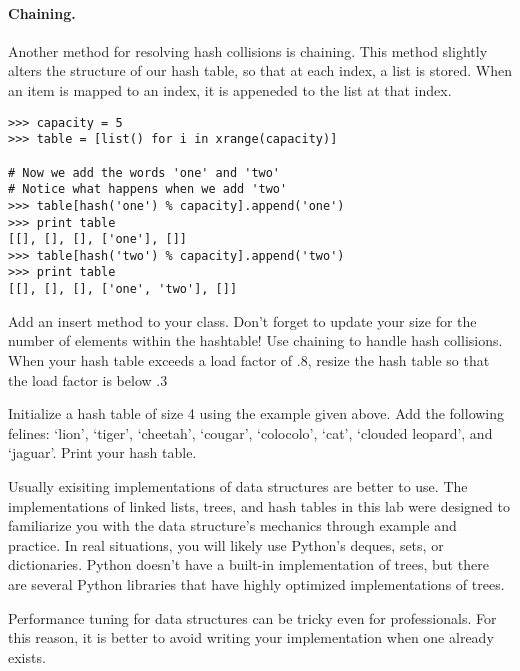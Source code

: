 \paragraph{Chaining.}
Another method for resolving hash collisions is chaining.
This method slightly alters the structure of our hash table, so that at each index, a list is stored.
When an item is mapped to an index, it is appeneded to the list at that index.
\begin{lstlisting}
>>> capacity = 5
>>> table = [list() for i in xrange(capacity)]

# Now we add the words 'one' and 'two'
# Notice what happens when we add 'two'
>>> table[hash('one') % capacity].append('one')
>>> print table
[[], [], [], ['one'], []]
>>> table[hash('two') % capacity].append('two')
>>> print table
[[], [], [], ['one', 'two'], []]
\end{lstlisting}

\begin{problem}
Add an insert method to your  class. Don't forget to update your size for the number of elements within the hashtable!
Use chaining to handle hash collisions.
When your hash table exceeds a load factor of .8, resize the hash table so that the load factor is below .3

Initialize a hash table of size 4 using the example  given above.
Add the following felines: `lion', `tiger', `cheetah', `cougar', `colocolo', `cat', `clouded leopard', and `jaguar'.
Print your hash table.
\label{prob:hash_table}
\end{problem}

\begin{info}
Usually exisiting implementations of data structures are better to use.
The implementations of linked lists, trees, and hash tables in this lab were designed to familiarize you with the data structure's mechanics through example and practice.
In real situations, you will likely use Python's deques, sets, or dictionaries.
Python doesn't have a built-in implementation of trees, but there are several Python libraries that have highly optimized implementations of trees.

Performance tuning for data structures can be tricky even for professionals.  
For this reason, it is better to avoid writing your implementation when one already exists.
\end{info}
